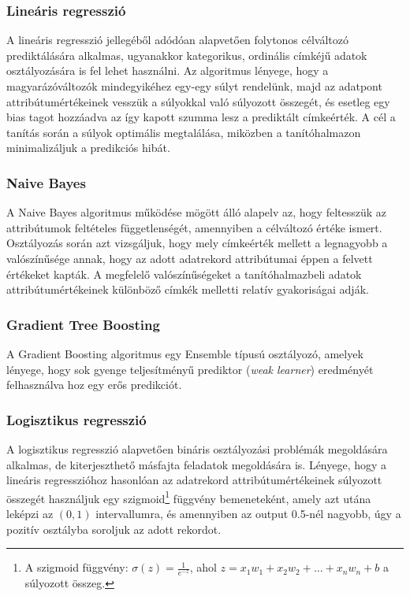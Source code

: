 \documentclass[12pt]{article}
\begin{document}
\subsubsection{Lineáris regresszió}

A lineáris regresszió jellegéből adódóan alapvetően folytonos célváltozó prediktálására alkalmas, ugyanakkor kategorikus, ordinális címkéjű adatok osztályozására is fel lehet használni. Az algoritmus lényege, hogy a magyarázóváltozók mindegyikéhez egy-egy súlyt rendelünk, majd az adatpont attribútumértékeinek vesszük a súlyokkal való súlyozott összegét, és esetleg egy bias tagot hozzáadva az így kapott szumma lesz a prediktált címkeérték. A cél a tanítás során a súlyok optimális megtalálása, miközben a tanítóhalmazon minimalizáljuk a predikciós hibát.

\subsubsection{Naive Bayes}

A Naive Bayes algoritmus működése mögött álló alapelv az, hogy feltesszük az attribútumok feltételes függetlenségét, amennyiben a célváltozó értéke ismert. Osztályozás során azt vizsgáljuk, hogy mely címkeérték mellett a legnagyobb a valószínűsége annak, hogy az adott adatrekord attribútumai éppen a felvett értékeket kapták. A megfelelő valószínűségeket a tanítóhalmazbeli adatok attribútumértékeinek különböző címkék melletti relatív gyakoriságai adják.

\subsubsection{Gradient Tree Boosting}

A Gradient Boosting algoritmus egy Ensemble típusú osztályozó, amelyek lényege, hogy sok gyenge teljesítményű prediktor (\textit{weak learner}) eredményét felhasználva hoz egy erős predikciót. 

\subsubsection{Logisztikus regresszió}

A logisztikus regresszió alapvetően bináris osztályozási problémák megoldására alkalmas, de kiterjeszthető másfajta feladatok megoldására is. Lényege, hogy a lineáris regresszióhoz hasonlóan az adatrekord attribútumértékeinek súlyozott összegét használjuk egy szigmoid\footnote{A szigmoid függvény: $\sigma(z)=\frac{1}{e^{-z}}$, ahol $z=x_1w_1+x_2w_2+ \dots +x_nw_n+b$ a súlyozott összeg.} függvény bemeneteként, amely azt utána leképzi az $\left(0,1\right)$ intervallumra, és amennyiben az output 0.5-nél nagyobb, úgy a pozitív osztályba soroljuk az adott rekordot.
\end{document}
